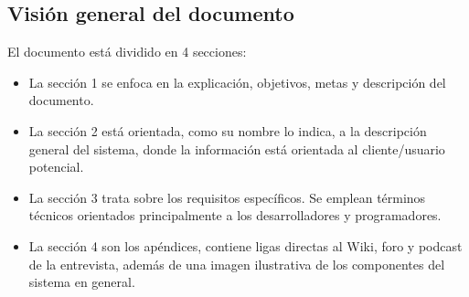 \subsection{Visión general del documento}

El documento está dividido en 4 secciones: 

\begin{itemize}
\item La sección 1 se enfoca en la explicación, objetivos, metas y descripción del documento. 
\item La sección 2 está orientada, como su nombre lo indica, a la descripción general del sistema, donde la información está orientada al cliente/usuario potencial. 
\item La sección 3 trata sobre los requisitos específicos. Se emplean términos técnicos orientados principalmente a los desarrolladores y programadores.
\item La sección 4 son los apéndices, contiene ligas directas al Wiki, foro y podcast de la entrevista, además de una imagen ilustrativa de los componentes del sistema en general.
\end{itemize}


